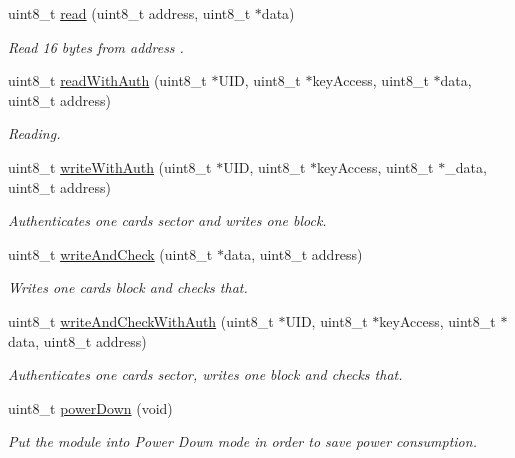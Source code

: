 \begin{DoxyCompactItemize}
uint8\+\_\+t \hyperlink{class_wasp_r_f_i_d_a77952c14f93658a5ad612e927747bab7}{read} (uint8\+\_\+t address, uint8\+\_\+t $\ast$data)
\begin{DoxyCompactList}\small\item\em Read 16 bytes from address . \end{DoxyCompactList}\item 
uint8\+\_\+t \hyperlink{class_wasp_r_f_i_d_acd7871ca6111f276b57c796f5ca77f45}{read\+With\+Auth} (uint8\+\_\+t $\ast$U\+ID, uint8\+\_\+t $\ast$key\+Access, uint8\+\_\+t $\ast$data, uint8\+\_\+t address)
\begin{DoxyCompactList}\small\item\em Reading. \end{DoxyCompactList}\item 
uint8\+\_\+t \hyperlink{class_wasp_r_f_i_d_ac792f36e5655aff3bd4e387844d38376}{write\+With\+Auth} (uint8\+\_\+t $\ast$U\+ID, uint8\+\_\+t $\ast$key\+Access, uint8\+\_\+t $\ast$\+\_\+data, uint8\+\_\+t address)
\begin{DoxyCompactList}\small\item\em Authenticates one card\textquotesingle{}s sector and writes one block. \end{DoxyCompactList}\item 
uint8\+\_\+t \hyperlink{class_wasp_r_f_i_d_ac113e73110560933d245d3b02feeec22}{write\+And\+Check} (uint8\+\_\+t $\ast$data, uint8\+\_\+t address)
\begin{DoxyCompactList}\small\item\em Writes one card\textquotesingle{}s block and checks that. \end{DoxyCompactList}\item 
uint8\+\_\+t \hyperlink{class_wasp_r_f_i_d_ada8bba83ec83cabb93b0d16e43ceebd7}{write\+And\+Check\+With\+Auth} (uint8\+\_\+t $\ast$U\+ID, uint8\+\_\+t $\ast$key\+Access, uint8\+\_\+t $\ast$data, uint8\+\_\+t address)
\begin{DoxyCompactList}\small\item\em Authenticates one card\textquotesingle{}s sector, writes one block and checks that. \end{DoxyCompactList}\item 
uint8\+\_\+t \hyperlink{class_wasp_r_f_i_d_a3f140dfd2b557d986e3f9498d9409972}{power\+Down} (void)
\begin{DoxyCompactList}\small\item\em Put the module into Power Down mode in order to save power consumption. \end{DoxyCompactList}\item 

\end{DoxyCompactItemize}
